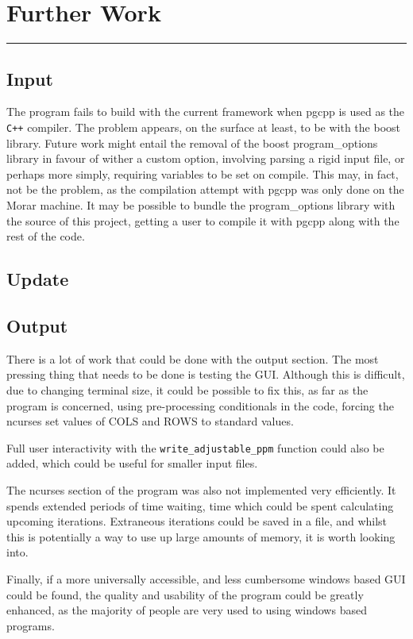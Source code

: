 \section{Further Work}
\vspace{-2em}\rule{\textwidth}{1pt}\vspace{-1em}
\subsection{Input}
  The program fails to build with the current framework when pgcpp is used
  as the \texttt{C++} compiler.
  The problem appears, on the surface at least, to be with the boost library.
  Future work might entail the removal of the boost program\_options library
  in favour of wither a custom option, involving parsing a rigid input file,
  or perhaps more simply, requiring variables to be set on compile.
  This may, in fact, not be the problem, as the compilation attempt with
  pgcpp was only done on the Morar machine.
  It may be possible to bundle the program\_options library with the
  source of this project, getting a user to compile it with pgcpp along
  with the rest of the code.
\subsection{Update}
\subsection{Output}
	There is a lot of work that could be done with the output section.
	The most pressing thing that needs to be done is testing the GUI.
	Although this is difficult, due to changing terminal size, it could be possible to fix this, as far as the program is concerned, using
	pre-processing conditionals in the code, forcing the ncurses set values of COLS and ROWS to standard values.
	
	Full user interactivity with the \texttt{write\_adjustable\_ppm} function could also be added, which could be useful for smaller input files.

	The ncurses section of the program was also not implemented very efficiently.
	It spends extended periods of time waiting, time which could be spent calculating upcoming iterations.
	Extraneous iterations could be saved in a file, and whilst this is potentially a way to use up large amounts of memory, it is worth looking into.
	
	Finally, if a more universally accessible, and less cumbersome windows based GUI could be found, the quality and usability of the program could be greatly enhanced, as the majority of people are very used to using windows based programs.
